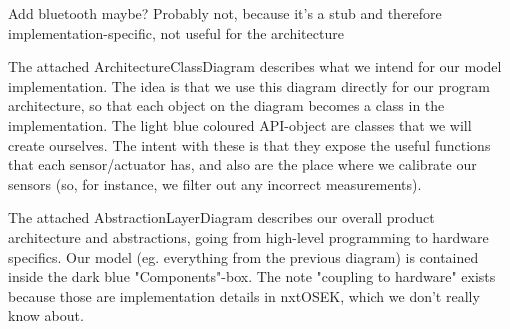 Add bluetooth maybe? Probably not, because it's a stub and therefore implementation-specific, not useful for the architecture


The attached ArchitectureClassDiagram describes what we intend for our model implementation. The idea is that we use this diagram directly for our program architecture, so that each object on the diagram becomes a class in the implementation. The light blue coloured API-object are classes that we will create ourselves. The intent with these is that they expose the useful functions that each sensor/actuator has, and also are the place where we calibrate our sensors (so, for instance, we filter out any incorrect measurements).

The attached AbstractionLayerDiagram describes our overall product architecture and abstractions, going from high-level programming to hardware specifics. Our model (eg. everything from the previous diagram) is contained inside the dark blue "Components"-box. The note "coupling to hardware" exists because those are implementation details in nxtOSEK, which we don't really know about.


%

